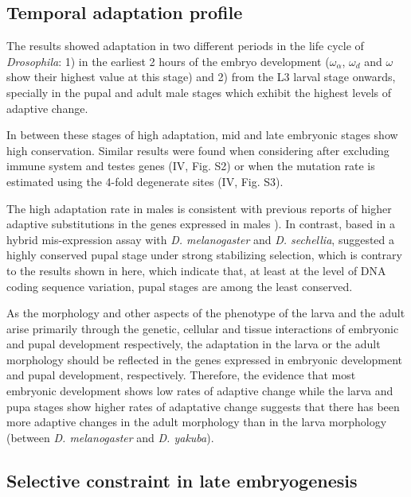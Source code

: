 
\subsection{Temporal adaptation profile}

The results showed adaptation in two different periods in the life cycle of \textit{Drosophila}: 
1) in the earliest 2 hours of the embryo development ($\omega_{\alpha}$, $\omega_{d}$ and $\omega$ show their highest value at this stage) and 
2) from the L3 larval stage onwards, specially in the pupal and adult male stages which exhibit the highest levels of adaptive change.

In between these stages of high adaptation, mid and late embryonic stages show high conservation. 
Similar results were found when considering after excluding immune system and testes genes (IV, Fig. S2) or when the mutation rate is estimated using the 4-fold degenerate sites (IV, Fig. S3).

The high adaptation rate in males is consistent with previous reports of higher adaptive substitutions in the genes expressed in males \citealp{Proschel2006,Haerty2007}). 
In contrast, based in a hybrid mis-expression assay with \textit{D. melanogaster} and \textit{D. sechellia}, \citet{Artieri2010} suggested a highly conserved pupal stage under strong stabilizing selection, which is contrary to the results shown in here, which indicate that, at least at the level of DNA coding sequence variation, pupal stages are among the least conserved.

As the morphology and other aspects of the phenotype of the larva and the adult arise primarily through the genetic, cellular and tissue interactions of embryonic and pupal development respectively, the adaptation in the larva or the adult morphology should be reflected in the genes expressed in embryonic development and pupal development, respectively.
Therefore, the evidence that most embryonic development shows low rates of adaptive change while the larva and pupa stages show higher rates of adaptative change suggests that there has been more adaptive changes in the adult morphology than in the larva morphology (between \textit{D. melanogaster} and \textit{D. yakuba}).

\subsection{Selective constraint in late embryogenesis} \label{OmegaA_late_embryo}

